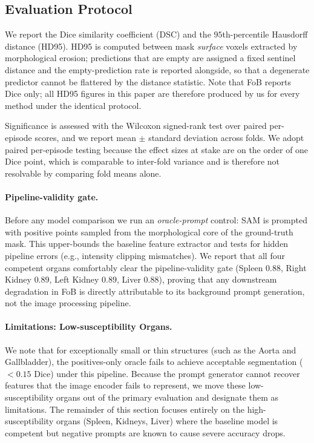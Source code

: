 \subsection{Evaluation Protocol}
\label{subsec:evaluation}

We report the Dice similarity coefficient (DSC) and the $95$th-percentile
Hausdorff distance (HD95). HD95 is computed between mask \emph{surface} voxels
extracted by morphological erosion; predictions that are empty are assigned a
fixed sentinel distance and the empty-prediction rate is reported alongside, so
that a degenerate predictor cannot be flattered by the distance statistic. Note
that FoB reports Dice only; all HD95 figures in this paper are therefore
produced by us for every method under the identical protocol.

Significance is assessed with the Wilcoxon signed-rank test over paired
per-episode scores, and we report mean $\pm$ standard deviation across folds.
We adopt paired per-episode testing because the effect sizes at stake are on
the order of one Dice point, which is comparable to inter-fold variance and is
therefore not resolvable by comparing fold means alone.

\paragraph{Pipeline-validity gate.}
Before any model comparison we run an \emph{oracle-prompt} control: SAM is
prompted with positive points sampled from the morphological core of the
ground-truth mask. This upper-bounds the baseline feature extractor and tests
for hidden pipeline errors (e.g., intensity clipping mismatches). We report
that all four competent organs comfortably clear the pipeline-validity gate
(Spleen $0.88$, Right Kidney $0.89$, Left Kidney $0.89$, Liver $0.88$), proving
that any downstream degradation in FoB is directly attributable to its background
prompt generation, not the image processing pipeline.

\paragraph{Limitations: Low-susceptibility Organs.}
We note that for exceptionally small or thin structures (such as the Aorta and
Gallbladder), the positives-only oracle fails to achieve acceptable segmentation
($< 0.15$ Dice) under this pipeline. Because the prompt generator cannot recover
features that the image encoder fails to represent, we move these
low-susceptibility organs out of the primary evaluation and designate them as
limitations. The remainder of this section focuses entirely on the
high-susceptibility organs (Spleen, Kidneys, Liver) where the baseline model
is competent but negative prompts are known to cause severe accuracy drops.

